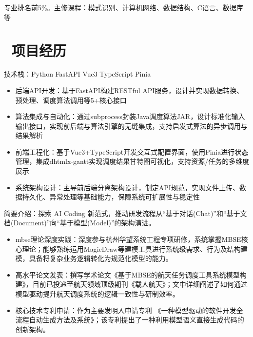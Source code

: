 \documentclass{resume} %
\begin{document}
	专业排名前5\%。主修课程：模式识别、计算机网络、数据结构、C语言、数据库等
	
	\section{\faBriefcase\ 项目经历}

	\large {技术栈：Python \textbullet{} FastAPI \textbullet{} Vue3 \textbullet{} TypeScript \textbullet{} Pinia}
	\begin{itemize}
		\item 后端API开发：基于FastAPI构建RESTful API服务，设计并实现数据转换、预处理、调度算法调用等5+核心接口
		\item 算法集成与自动化：通过subprocess封装Java调度算法JAR，设计标准化输入输出接口，实现前后端与算法引擎的无缝集成，支持启发式算法的异步调用与结果解析
		\item 前端工程化：基于Vue3+TypeScript开发交互式配置界面，使用Pinia进行状态管理，集成dhtmlx-gantt实现调度结果甘特图可视化，支持资源/任务的多维度展示
		\item 系统架构设计：主导前后端分离架构设计，制定API规范，实现文件上传、数据持久化、异常处理等基础能力，保障系统可扩展性与稳定性
	\end{itemize}
	
	\large {简要介绍：探索 AI Coding 新范式，推动研发流程从“基于对话(Chat)”和“基于文档(Document)”向“基于模型(Model)”的架构演进。}
	\begin{itemize}
		\item mbse理论深度实践：深度参与杭州华望系统工程专项研修，系统掌握MBSE核心理论；能够熟练运用MagicDraw等建模工具进行系统级需求、行为及结构建模，具备将复杂业务逻辑转化为规范化模型的能力。
		\item 高水平论文发表：撰写学术论文《基于MBSE的航天任务调度工具系统模型构建》，目前已投递至航天领域顶级期刊《载人航天》；文中详细阐述了如何通过模型驱动提升航天调度系统的逻辑一致性与研制效率。
		\item 核心技术专利申请：作为主要发明人申请专利 《一种模型驱动的软件开发全流程自动生成方法及系统》；该专利提出了一种利用模型语义直接生成代码的创新架构。
	\end{itemize}
	
\end{document}
